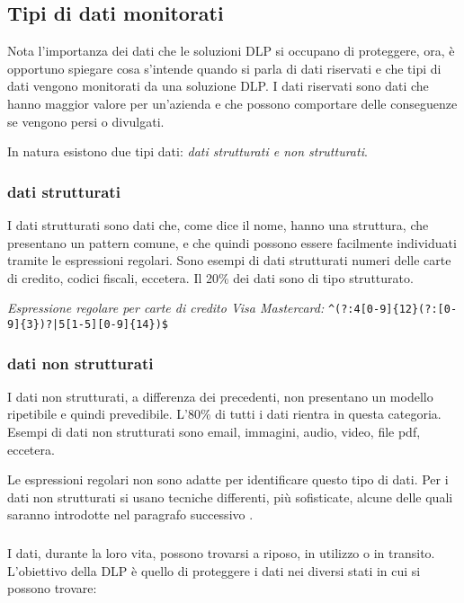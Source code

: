 \subsection{Tipi di dati monitorati}
    Nota l'importanza dei dati che le soluzioni DLP si occupano di proteggere,
    ora, è opportuno spiegare cosa s'intende quando si parla di dati riservati e che tipi di dati vengono monitorati 
    da una soluzione DLP. I dati riservati sono dati che hanno maggior valore per un'azienda e che possono comportare 
    delle conseguenze se vengono persi o divulgati.

    In natura esistono due tipi dati: \textit{dati strutturati e non strutturati}.
        \subsubsection{dati strutturati}
            I dati strutturati sono dati che, come dice il nome, hanno una struttura, che presentano un pattern comune, e che 
            quindi possono essere facilmente individuati tramite le espressioni regolari. 
            Sono esempi di dati strutturati numeri delle carte di credito, codici fiscali, eccetera.
            Il 20\% dei dati sono di tipo strutturato. 
    
            \begin{center} 
                \textit{Espressione regolare per carte di credito Visa Mastercard:}
                \verb/^(?:4[0-9]{12}(?:[0-9]{3})?|5[1-5][0-9]{14})$/ 
            \end{center}

        \subsubsection{dati non strutturati}
            I dati non strutturati, a differenza dei precedenti, non presentano un modello ripetibile
            e quindi prevedibile. L'80\% di tutti i dati rientra in questa categoria. Esempi di dati non 
            strutturati sono email, immagini, audio, video, file pdf, eccetera. 
    
    Le espressioni regolari non sono adatte per identificare questo tipo di dati. %
    Per i dati non strutturati si usano tecniche differenti, più sofisticate, alcune delle quali saranno introdotte nel paragrafo successivo \cite{DLP3}.

    \subsubsection*{}
    I dati, durante la loro vita, possono trovarsi a riposo, in utilizzo o in transito.
    L'obiettivo della DLP è quello di proteggere i dati nei diversi stati in cui si possono trovare:
    \cite{DLP1}

